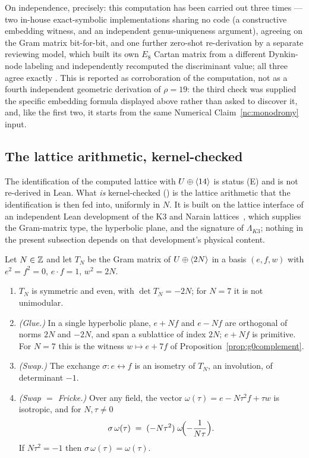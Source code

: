 On independence, precisely: this computation has been carried out three
times --- two in-house exact-symbolic implementations sharing no code (a
constructive embedding witness, and an independent genus-uniqueness argument),
agreeing on the Gram matrix bit-for-bit, and one further zero-shot
re-derivation by a separate reviewing model, which built its own $E_8$ Cartan
matrix from a different Dynkin-node labeling and independently recomputed the
discriminant value; all three agree exactly
\cite{G0NSGenus2026,G0DecisionLog2026}. This is reported as corroboration of
the computation, not as a fourth independent geometric derivation of $\rho=19$:
the third check was supplied the specific embedding formula displayed above
rather than asked to discover it, and, like the first two, it starts from the
same Numerical Claim~\ref{nc:monodromy} input.

\subsection{The lattice arithmetic, kernel-checked}\label{subsec:mn-lean}

The identification of the computed lattice with $U\oplus\langle 14\rangle$ is status
(E) and is not re-derived in Lean. What \emph{is} kernel-checked
() is the lattice arithmetic that the
identification is then fed into, uniformly in $N$. It is built on the lattice
interface of an independent Lean development of the K3 and Narain
lattices~\cite{LeanMaster2026}, which supplies the Gram-matrix type, the
hyperbolic plane, and the signature of $\Lambda_{K3}$; nothing in the present
subsection depends on that development's physical content.

\begin{proposition}[status (K)]\label{prop:mn-lean}
Let $N\in\mathbb{Z}$ and let $T_N$ be the Gram matrix of $U\oplus\langle 2N\rangle$ in a basis
$(e,f,w)$ with $e^2=f^2=0$, $e\cdot f=1$, $w^2=2N$.
\begin{enumerate}
\item $T_N$ is symmetric and even, with $\det T_N=-2N$; for $N=7$ it is not
  unimodular.
\item \emph{(Glue.)} In a single hyperbolic plane, $e+Nf$ and $e-Nf$ are
  orthogonal of norms $2N$ and $-2N$, and span a sublattice of index $2N$;
  $e+Nf$ is primitive. For $N=7$ this is the witness $w\mapsto e+7f$ of
  Proposition~\ref{prop:g0complement}.
\item \emph{(Swap.)} The exchange $\sigma\colon e\leftrightarrow f$ is an
  isometry of $T_N$, an involution, of determinant $-1$.
\item \emph{(Swap $=$ Fricke.)} Over any field, the vector
  $\omega(\tau)=e-N\tau^2f+\tau w$ is isotropic, and for $N,\tau\neq0$
  \[
    \sigma\,\omega(\tau) \;=\; (-N\tau^2)\;\omega\!\Bigl(-\frac{1}{N\tau}\Bigr).
  \]
  If $N\tau^2=-1$ then $\sigma\,\omega(\tau)=\omega(\tau)$.
\end{enumerate}
\end{proposition}

